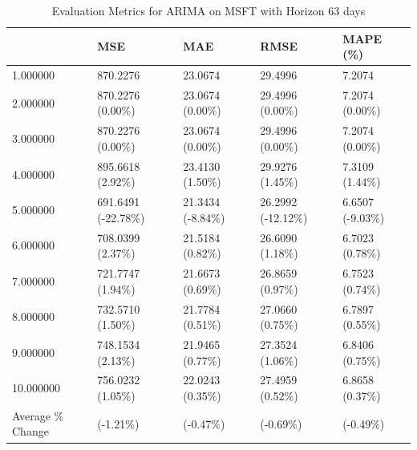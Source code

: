 \begin{table}
\caption{Evaluation Metrics for ARIMA on MSFT with Horizon 63 days}
\label{tab:arima_MSFT_h63_metrics}
\begin{tabular}{lllll}
\toprule
 & MSE & MAE & RMSE & MAPE (\%) \\
\midrule
1.000000 & 870.2276 & 23.0674 & 29.4996 & 7.2074 \\
2.000000 & 870.2276 (0.00\%) & 23.0674 (0.00\%) & 29.4996 (0.00\%) & 7.2074 (0.00\%) \\
3.000000 & 870.2276 (0.00\%) & 23.0674 (0.00\%) & 29.4996 (0.00\%) & 7.2074 (0.00\%) \\
4.000000 & 895.6618 (2.92\%) & 23.4130 (1.50\%) & 29.9276 (1.45\%) & 7.3109 (1.44\%) \\
5.000000 & 691.6491 (-22.78\%) & 21.3434 (-8.84\%) & 26.2992 (-12.12\%) & 6.6507 (-9.03\%) \\
6.000000 & 708.0399 (2.37\%) & 21.5184 (0.82\%) & 26.6090 (1.18\%) & 6.7023 (0.78\%) \\
7.000000 & 721.7747 (1.94\%) & 21.6673 (0.69\%) & 26.8659 (0.97\%) & 6.7523 (0.74\%) \\
8.000000 & 732.5710 (1.50\%) & 21.7784 (0.51\%) & 27.0660 (0.75\%) & 6.7897 (0.55\%) \\
9.000000 & 748.1534 (2.13\%) & 21.9465 (0.77\%) & 27.3524 (1.06\%) & 6.8406 (0.75\%) \\
10.000000 & 756.0232 (1.05\%) & 22.0243 (0.35\%) & 27.4959 (0.52\%) & 6.8658 (0.37\%) \\
Average \% Change & (-1.21\%) & (-0.47\%) & (-0.69\%) & (-0.49\%) \\
\bottomrule
\end{tabular}
\end{table}
